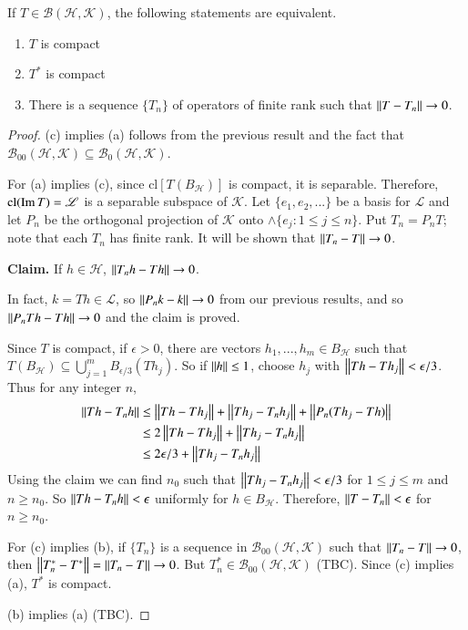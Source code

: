 \begin{thm}
    If $T \in \mathscr{B}(\mathscr{H},\mathscr{K})$, the following statements are equivalent.
    \begin{enumerate}
        \item[(a)] $T$ is compact
        \item[(b)] $T^*$ is compact
        \item[(c)] There is a sequence $\{T_n\}$ of operators of finite rank such that $\left|\left| T-T_n\right|\right|\rightarrow 0$.
    \end{enumerate}
\end{thm}
\begin{proof}
    (c) implies (a) follows from the previous result and the fact that $\mathscr{B}_{00}(\mathscr{H},\mathscr{K}) \subseteq \mathscr{B}_0(\mathscr{H},\mathscr{K})$.

    For (a) implies (c), since $\text{cl}[T(B_{\mathscr{H}})]$ is compact, it is separable. Therefore, $\text{cl}(\operatorname{Im} T) = \mathscr{L}$ is a separable subspace of $\mathscr{K}$. Let $\{e_1,e_2,...\}$ be a basis for $\mathscr{L}$ and let $P_n$ be the orthogonal projection of $\mathscr{K}$ onto $\land\{e_j:1\leq j\leq n\}$. Put $T_n = P_nT$; note that each $T_n$ has finite rank. It will be shown that $\left|\left| T_n-T\right|\right|\rightarrow 0$.

    \textbf{Claim.} If $h \in \mathscr{H}$, $\left|\left| T_nh-Th\right|\right|\rightarrow 0$.

    In fact, $k = Th \in \mathscr{L}$, so $\left|\left| P_nk-k\right|\right|\rightarrow 0$ from our previous results, and so $\left|\left| P_nTh-Th\right|\right| \rightarrow 0$ and the claim is proved.

    Since $T$ is compact, if $\epsilon > 0$, there are vectors $h_1,...,h_m \in B_{\mathscr{H}}$ such that $T(B_{\mathscr{H}}) \subseteq \bigcup_{j=1}^mB_{\epsilon/3}(Th_j)$. So if $\left|\left| h\right|\right| \leq 1$, choose $h_j$ with $\left|\left| Th-Th_j\right|\right| < \epsilon/3$. Thus for any integer $n$, \begin{align*}
        \left|\left| Th-T_nh\right|\right|&\leq \left|\left| Th-Th_j\right|\right|+\left|\left| Th_j-T_nh_j\right|\right|+\left|\left| P_n(Th_j-Th)\right|\right| \\
        &\leq 2\left|\left| Th-Th_j\right|\right|+\left|\left| Th_j-T_nh_j\right|\right| \\
        &\leq 2\epsilon/3+\left|\left| Th_j-T_nh_j\right|\right|
    \end{align*}
    Using the claim we can find $n_0$ such that $\left|\left| Th_j-T_nh_j\right|\right| < \epsilon/3$ for $1 \leq j \leq m$ and $n \geq n_0$. So $\left|\left| Th-T_nh\right|\right| < \epsilon$ uniformly for $h \in B_{\mathscr{H}}$. Therefore, $\left|\left| T-T_n\right|\right| < \epsilon$ for $n \geq n_0$.

    For (c) implies (b), if $\{T_n\}$ is a sequence in $\mathscr{B}_{00}(\mathscr{H},\mathscr{K})$ such that $\left|\left| T_n-T\right|\right|\rightarrow 0$, then $\left|\left| T_n^*-T^*\right|\right| = \left|\left| T_n-T\right|\right|\rightarrow 0$. But $T_n^* \in \mathscr{B}_{00}(\mathscr{H},\mathscr{K})$ (TBC). Since (c) implies (a), $T^*$ is compact.

    (b) implies (a) (TBC).
\end{proof}

